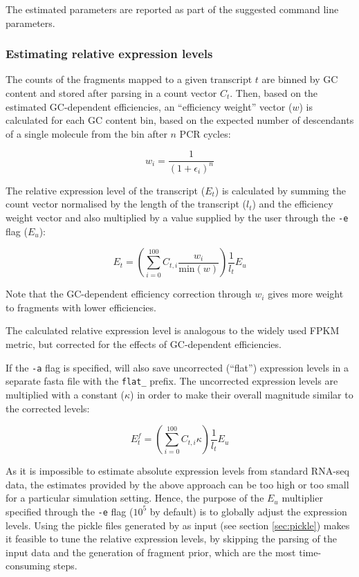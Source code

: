 The estimated parameters are reported as part of the suggested \rlsim command line parameters.

\subsubsection{Estimating relative expression levels}

The counts of the fragments mapped to a given transcript $t$ are binned by GC content and stored after parsing in a count vector $C_t$.
Then, based on the estimated GC-dependent efficiencies, an ``efficiency weight'' vector ($w$) is calculated for each GC content bin, based on the expected number of descendants of a single molecule from the bin after $n$ PCR cycles:

\begin{equation}
    w_i = \frac{1}{\left(1+\epsilon_i\right)^n}
\end{equation}

The relative expression level of the transcript ($E_t$) is calculated by summing the count vector normalised by the length of the transcript ($l_t$) and the efficiency weight vector and also multiplied by a value supplied by the user through the \texttt{-e} flag ($E_u$):

\begin{equation}
    E_t = \left( \sum_{i=0}^{100} C_{t,i} \frac{w_i}{\mathrm{min}(w)} \right) \frac{1}{l_t} E_u
\end{equation}

Note that the GC-dependent efficiency correction through $w_i$ gives more weight to fragments with lower efficiencies.

The calculated relative expression level is analogous to the widely used FPKM metric, but corrected for the effects of GC-dependent efficiencies.

If the \texttt{-a} flag is specified, \effest will also save uncorrected (``flat'') expression levels in a separate fasta file with the \texttt{flat\_} prefix.
The uncorrected expression levels are multiplied with a constant ($\kappa$) in order to make their overall magnitude similar to the corrected levels:

\begin{equation}
    E_t^f = \left( \sum_{i=0}^{100} C_{t,i} \kappa \right) \frac{1}{l_t} E_u
\end{equation}


As it is impossible to estimate absolute expression levels from standard RNA-seq data, the estimates provided by the above approach can be too high or too small for a particular simulation setting. Hence, the purpose of the $E_u$ multiplier specified through the \texttt{-e} flag ($10^5$ by default) is to globally adjust the expression levels. Using the pickle files generated by \effest as input (see section \ref{sec:pickle}) makes it feasible to tune the relative expression levels, by skipping the parsing of the input data and the generation of fragment prior, which are the most time-consuming steps.

